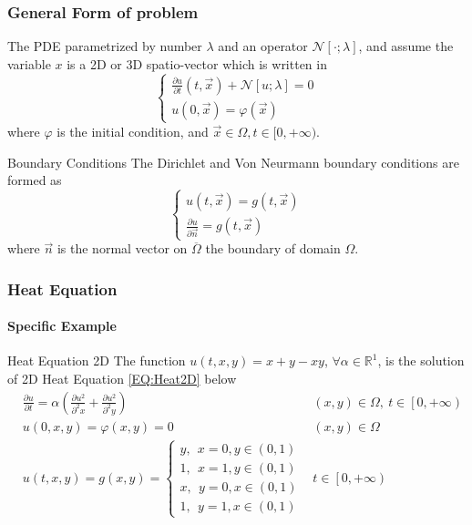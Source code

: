 \begin{frame}
  \frametitle{General Form of problem}
  \begin{block}{}
    The PDE parametrized by number $\lambda$ and an operator $\mathcal{N}[\cdot; \lambda]$, 
    and assume the variable $x$ is a 2D or 3D spatio-vector which is written in 
    \begin{equation}
      \begin{cases}
        \displaystyle \frac{\partial u}{\partial t}\left(t,\vec{x}\right) + \mathcal{N}\left[u;\lambda\right] = 0 \\
        \displaystyle u\left(0,\vec{x}\right) = \varphi (\vec{x})
      \end{cases}
    \end{equation}
    where $\varphi$ is the initial condition, and $\vec{x}\in \Omega, t\in[0, +\infty)$.
  \end{block}



  \begin{block}{Boundary Conditions}
    The Dirichlet and Von Neurmann boundary conditions are formed as 
    \begin{equation}
      \begin{cases}
        \displaystyle u\left(t,\vec{x}\right) = g (t,\vec{x}) \\
        \displaystyle \frac{\partial u}{\partial \vec{n}} = g (t,\vec{x})  
      \end{cases}
    \end{equation}
    where $\vec{n}$ is the normal vector on $\overline{\Omega}$ the boundary of domain $\Omega$.
  \end{block}
\end{frame}

\begin{frame}
  \frametitle{Heat Equation}
  \framesubtitle{Specific Example}
  \begin{block}{Heat Equation 2D}
    The function $u(t,x,y) = x + y - xy$, $\forall \alpha \in \mathbb{R}^1 $, is the solution of 2D Heat Equation \ref{EQ:Heat2D} below
    \begin{align}\label{EQ:Heat2D}
      &\frac{\partial u}{\partial t} = \alpha \left(
        \frac{\partial u^2}{\partial^2 x}
        +
        \frac{\partial u^2}{\partial^2 y}
      \right) &(x,y) \in \Omega, \: t \in \left[0, +\infty\right)  \nonumber\\
      &u(0,x,y)  = \varphi(x,y) = 0 &(x,y) \in \Omega\\
      &u(t,x,y)
       = g(x,y)
       = \begin{cases}
        y, \:\: x=0, y\in\left(0,1\right)\\
        1, \:\: x=1, y\in\left(0,1\right)\\
        x, \:\: y=0, x\in\left(0,1\right)\\
        1, \:\: y =1, x\in\left(0,1\right)
      \end{cases}
      &t \in \left[0, +\infty\right) \nonumber
    \end{align}
  \end{block}
\end{frame}


